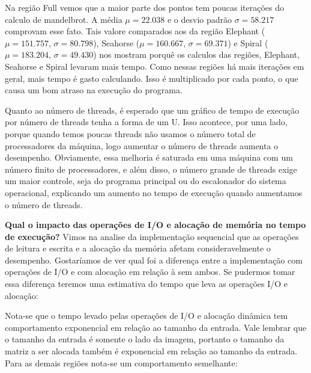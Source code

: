 \documentclass[12pt]{article}
\begin{document}
Na região Full vemos que a maior parte dos pontos tem poucas iterações do calculo de mandelbrot. A média $\mu = 22.038$ e o desvio padrão $\sigma = 58.217$ comprovam esse fato. Tais valore comparados aos da região Elephant ($\mu = 151.757$, $\sigma = 80.798$), Seahorse ($\mu = 160.667$, $\sigma = 69.371$) e Spiral ($\mu = 183.204$, $\sigma = 49.430$) nos mostram porquê os calculos das regiões, Elephant, Seahorse e Spiral levaram mais tempo. Como nessas regiões há mais iterações em geral, mais tempo é gasto calculando. Isso é multiplicado por cada ponto, o que causa um bom atraso na execução do programa. 

Quanto ao número de threads, é esperado que um gráfico de tempo de 
execução por número de threads tenha a forma de um U. Isso acontece, por
uma lado, porque quando temos poucas threads não usamos o número total
de processadores da máquina, logo aumentar o número de threads aumenta
o desempenho. Obviamente, essa melhoria é saturada em uma máquina com
um número finito de processadores, e além disso, o número grande de 
threads exige um maior controle, seja do programa principal ou do 
escalonador do sistema operacional, explicando um aumento no tempo
de execução quando aumentamos o número de threads.

{\bf Qual o impacto das operações de I/O e alocação de memória no tempo de execução?}
Vimos na analise da implementação sequencial que as operações de leitura e escrita e a alocação da memória afetam consideravelmente o desempenho. Gostaríamos de ver qual foi a diferença entre a implementação com operações de I/O e com alocação em relação à sem ambos. Se pudermos tomar essa diferença teremos uma estimativa do tempo que leva as operações I/O e alocação:


\begin{figure}[H]
\end{figure}

Nota-se que o tempo levado pelas operações de I/O e alocação dinâmica tem comportamento exponencial em relação ao tamanho da entrada. Vale lembrar que o tamanho da entrada é somente o lado da imagem, portanto o tamanho da matriz a ser alocada também é exponencial em relação ao tamanho da entrada. Para as demais regiões nota-se um comportamento semelhante:

\begin{figure}[H]
\end{figure}
\begin{figure}[H]
\end{figure}
\begin{figure}[H]
\end{figure}
\end{document}

